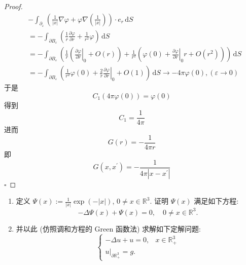 \documentclass[../../main.tex]{subfiles}
\begin{document}
\begin{proof}
\[\begin{aligned}
    &- \int_{ \partial _{ \varepsilon }}\left( \frac{1 }{\left| x \right|  } \nabla  \varphi +  \varphi  \nabla \left( \frac{1 }{\left| x \right|  }  \right)  \right)\cdot e_{r}\,\mathrm{d} S  \\ 
     &=- \int_{ \partial B_{ \varepsilon }}\left( \frac{1 }{r }\frac{\partial  \varphi }{\partial r}+ \frac{1 }{r^{2} } \varphi    \right)\,\mathrm{d} S\\ 
      &= - \int_{ \partial B_{ \varepsilon }}\left( \frac{1 }{r }\left( \left. \frac{\partial  \varphi   }{\partial r} \right|_{0}+O\left( r \right) \right) +  \frac{1 }{r^{2} }\left(  \varphi \left( 0 \right)+ \left. \frac{\partial  \varphi }{\partial r} \right|_{0}r+ O\left( r^{2} \right)   \right)     \right)  \,\mathrm{d} S\\ 
       &= -\int_{ \partial B_{ \varepsilon }}\left( \frac{1 }{r^{2} } \varphi \left( 0 \right)+ \frac{2 }{r }\left. \frac{\partial  \varphi }{\partial r} \right|_{0}+ O\left( 1 \right)     \right)\,\mathrm{d} S \to- 4\pi  \varphi \left( 0 \right),\left(  \varepsilon \to 0 \right)  
\end{aligned}    \]于是 \[
C_1 \left( 4\pi  \varphi \left( 0 \right)  \right)=  \varphi \left( 0 \right)  
\]得到 \[
C_1= \frac{1 }{4\pi  } 
\]进而\[
G\left( r \right)= -\frac{1 }{4\pi  r}  
\]即 \[
G\left( x,x^{\prime}  \right)= -\frac{1 }{4\pi \left| x-x^{\prime}  \right|  }  
\]
    \hfill $\square$
 \end{proof}


\begin{problemsec}
    
\end{problemsec}
\begin{problem}
\begin{enumerate}
    \item 定义 $\Psi(x) := \frac{1}{|x|} \operatorname{exp}(-|x|)$, $0 \neq x \in \mathbb{R}^3$. 证明 $\Psi(x)$ 满足如下方程:
    \[ -\Delta \Psi(x) + \Psi(x) = 0, \quad 0 \neq x \in \mathbb{R}^3. \]
    \item 并以此 (仿照调和方程的 Green 函数法) 求解如下定解问题:
    \[ \begin{cases} -\Delta u + u = 0, & x \in \mathbb{R}^3_+ \\ u|_{\partial \mathbb{R}^3_+} = g. \end{cases} \]
\end{enumerate}
\end{problem}
\end{document}
